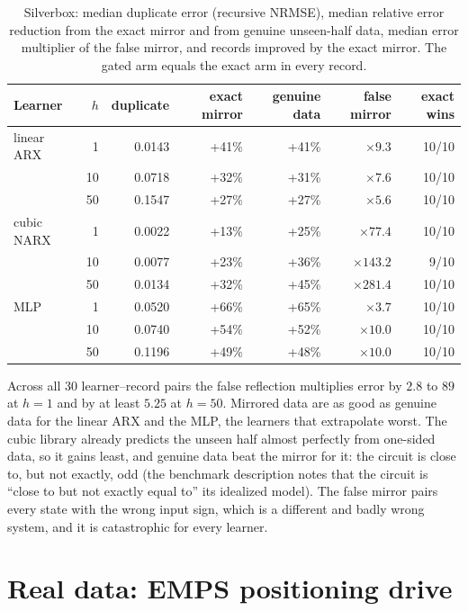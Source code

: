 \begin{table}[h]
\centering\small
\caption{Silverbox: median duplicate error (recursive NRMSE), median relative error reduction from the exact mirror and from genuine unseen-half data, median error multiplier of the false mirror, and records improved by the exact mirror. The gated arm equals the exact arm in every record.}
\label{tab:silverbox}
\begin{tabular}{lrrrrrr}
\toprule
Learner & $h$ & duplicate & exact mirror & genuine data & false mirror & exact wins\\
\midrule
linear ARX & 1 & 0.0143 & +41\% & +41\% & $\times9.3$ & 10/10\\
 & 10 & 0.0718 & +32\% & +31\% & $\times7.6$ & 10/10\\
 & 50 & 0.1547 & +27\% & +27\% & $\times5.6$ & 10/10\\
cubic NARX & 1 & 0.0022 & +13\% & +25\% & $\times77.4$ & 10/10\\
 & 10 & 0.0077 & +23\% & +36\% & $\times143.2$ & 9/10\\
 & 50 & 0.0134 & +32\% & +45\% & $\times281.4$ & 10/10\\
MLP & 1 & 0.0520 & +66\% & +65\% & $\times3.7$ & 10/10\\
 & 10 & 0.0740 & +54\% & +52\% & $\times10.0$ & 10/10\\
 & 50 & 0.1196 & +49\% & +48\% & $\times10.0$ & 10/10\\
\bottomrule
\end{tabular}
\end{table}
Across all 30 learner--record pairs the false reflection multiplies error by $2.8$ to $89$ at $h=1$ and by at least $5.25$ at $h=50$. Mirrored data are as good as genuine data for the linear ARX and the MLP, the learners that extrapolate worst. The cubic library already predicts the unseen half almost perfectly from one-sided data, so it gains least, and genuine data beat the mirror for it: the circuit is close to, but not exactly, odd (the benchmark description notes that the circuit is ``close to but not exactly equal to'' its idealized model). The false mirror pairs every state with the wrong input sign, which is a different and badly wrong system, and it is catastrophic for every learner.



\section{Real data: EMPS positioning drive}\label{app:emps}
